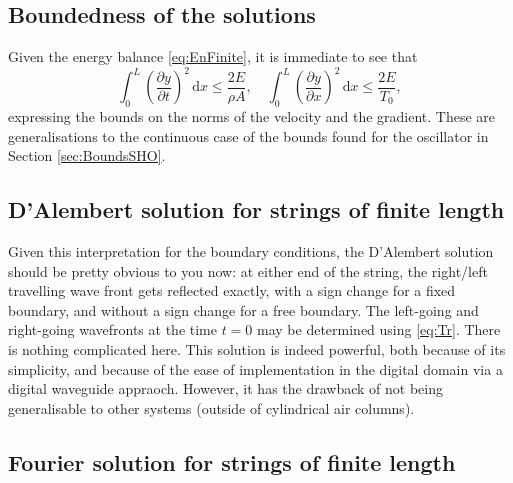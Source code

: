 \subsection{Boundedness of the solutions}\label{sec:BoundWECnt}

Given the energy balance \eqref{eq:EnFinite}, it is immediate to see that
\begin{equation}
\int_0^L \left( \frac{\partial y}{\partial t} \right)^2 \, \mathrm{d}x \leq \frac{2E}{\rho A}, \quad \int_0^L \left( \frac{\partial y}{\partial x} \right)^2 \, \mathrm{d}x \leq \frac{2E}{T_0},
\end{equation}
expressing the bounds on the norms of the velocity and the gradient. These are generalisations to the continuous case of the bounds found for the oscillator in Section \ref{sec:BoundsSHO}. 


\subsection{D'Alembert solution for strings of finite length}
Given this interpretation for the boundary conditions, the D'Alembert solution should be pretty obvious to you now: at either end of the string, the right/left travelling wave front gets reflected exactly, with a sign change for a fixed boundary, and without a sign change for a free boundary. The left-going and right-going wavefronts at the time $t=0$ may be determined using \eqref{eq:Tr}. There is nothing complicated here. This solution is indeed powerful, both because of its simplicity, and because of the ease of implementation in the digital domain via a digital waveguide appraoch. However, it has the drawback of not being generalisable to other systems (outside of cylindrical air columns).


\subsection{Fourier solution for strings of finite length}

